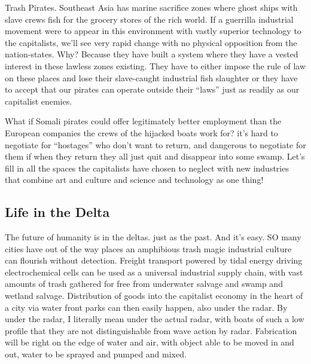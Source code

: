 Trash Pirates. Southeast Asia has marine sacrifice zones where ghost
ships with slave crews fish for the grocery stores of the rich world. If
a guerrilla industrial movement were to appear in this environment with
vastly superior technology to the capitalists, we'll see very rapid
change with no physical opposition from the nation-states. Why? Because
they have built a system where they have a vested interest in these
lawless zones existing. They have to either impose the rule of law on
these places and lose their slave-caught industrial fish slaughter or
they have to accept that our pirates can operate outside their ``laws''
just as readily as our capitalist enemies.

What if Somali pirates could offer legitimately better employment than
the European companies the crews of the hijacked boats work for? it's
hard to negotiate for ``hostages'' who don't want to return, and
dangerous to negotiate for them if when they return they all just quit
and disappear into some swamp. Let's fill in all the spaces the
capitalists have chosen to neglect with new industries that combine art
and culture and science and technology as one thing!

\subsection{Life in the Delta}\label{life-in-the-delta}

The future of humanity is in the deltas. just as the past. And it's
easy. SO many cities have out of the way places an amphibious trash
magic industrial culture can flourish without detection. Freight
transport powered by tidal energy driving electrochemical cells can be
used as a universal industrial supply chain, with vast amounts of trash
gathered for free from underwater salvage and swamp and wetland salvage.
Distribution of goods into the capitalist economy in the heart of a city
via water front parks can then easily happen, also under the radar. By
under the radar, I literally mean under the actual radar, with boats of
such a low profile that they are not distinguishable from wave action by
radar. Fabrication will be right on the edge of water and air, with
object able to be moved in and out, water to be sprayed and pumped and
mixed.

